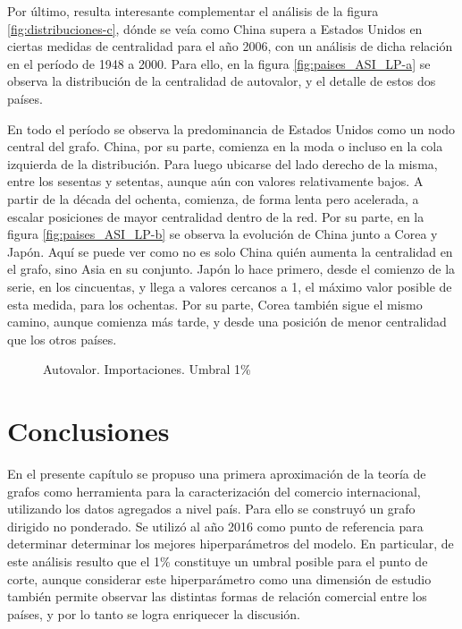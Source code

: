 \documentclass[class=article, crop=false]{standalone}
\begin{document}
Por último, resulta interesante complementar el análisis de la figura \ref{fig:distribuciones-c}, dónde se veía como China supera a Estados Unidos en ciertas medidas de centralidad para el año 2006, con un análisis de dicha relación en el período de 1948 a 2000. Para ello, en la figura \ref{fig:paises_ASI_LP-a} se observa la distribución de la centralidad de autovalor, y el detalle de estos dos países. \par
En todo el período se observa la predominancia de Estados Unidos como un nodo central del grafo. China, por su parte, comienza en la moda o incluso en la cola izquierda de la distribución. Para luego ubicarse del lado derecho de la misma, entre los sesentas y setentas, aunque aún con valores relativamente bajos. A partir de la década del ochenta, comienza, de forma lenta pero acelerada, a escalar posiciones de mayor centralidad dentro de la red. 
Por su parte, en la figura \ref{fig:paises_ASI_LP-b} se observa la evolución de China junto a Corea y Japón. Aquí se puede ver como no es solo China quién aumenta la centralidad en el grafo, sino Asia en su conjunto. Japón lo hace primero, desde el comienzo de la serie, en los cincuentas, y llega a valores cercanos a 1, el máximo valor posible de esta medida, para los ochentas. Por su parte, Corea también sigue el mismo camino, aunque comienza más tarde, y desde una posición de menor centralidad que los otros países. 

\begin{figure}[h!]
	\centering
	\caption{Autovalor. Importaciones. Umbral 1\%}
	\label{fig:paises_ASI_LP}
\end{figure}


\section{Conclusiones}

En el presente capítulo se propuso una primera aproximación de la teoría de grafos como herramienta para la caracterización del comercio internacional, utilizando los datos agregados a nivel país. Para ello se construyó un grafo dirigido no ponderado. Se utilizó al año 2016 como punto de referencia para determinar determinar los mejores hiperparámetros del modelo. En particular, de este análisis resulto que el 1\% constituye un umbral posible para el punto de corte, aunque considerar este hiperparámetro como una dimensión de estudio también permite observar las distintas formas de relación comercial entre los países, y por lo tanto se logra enriquecer la discusión. 
\end{document}
